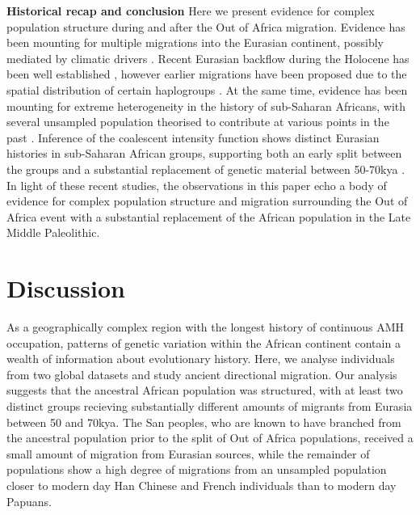 \documentclass{article}
\begin{document}
{\bf Historical recap and conclusion}
Here we present evidence for complex population structure during and after the Out of Africa migration. Evidence has been mounting for multiple migrations into the Eurasian continent, possibly mediated by climatic drivers \cite{Timmermann2016, Chen2020, Pagani2016}. Recent Eurasian backflow during the Holocene has been well established \cite{Lopez2015, GallegoLlorente2015}, however earlier migrations have been proposed due to the spatial distribution of certain haplogroups \cite{Altheide1997, Hammer1998, Cruciani2002, Chandrasekar2007, Cabrera2018, Hervella2016, Haber2019, Chen2020}. At the same time, evidence has been mounting for extreme heterogeneity in the history of sub-Saharan Africans, with several unsampled population theorised to contribute at various points in the past \cite{Lipson2019}. Inference of the coalescent intensity function shows distinct Eurasian histories in sub-Saharan African groups, supporting both an early split between the groups and a substantial replacement of genetic material between 50-70kya \cite{Albers2019}. In light of these recent studies, the observations in this paper echo a body of evidence for complex population structure and migration surrounding the Out of Africa event with a substantial replacement of the African population in the Late Middle Paleolithic.  



\section{Discussion}

As a geographically complex region with the longest history of continuous AMH occupation, patterns of genetic variation within the African continent contain a wealth of information about evolutionary history. Here, we analyse individuals from two global datasets and study ancient directional migration. Our analysis suggests that the ancestral African population was structured, with at least two distinct groups recieving substantially different amounts of migrants from Eurasia between 50 and 70kya. The San peoples, who are known to have branched from the ancestral population prior to the split of Out of Africa populations, received a small amount of migration from Eurasian sources, while the remainder of populations show a high degree of migrations from an unsampled population closer to modern day Han Chinese and French individuals than to modern day Papuans. 
\end{document}
